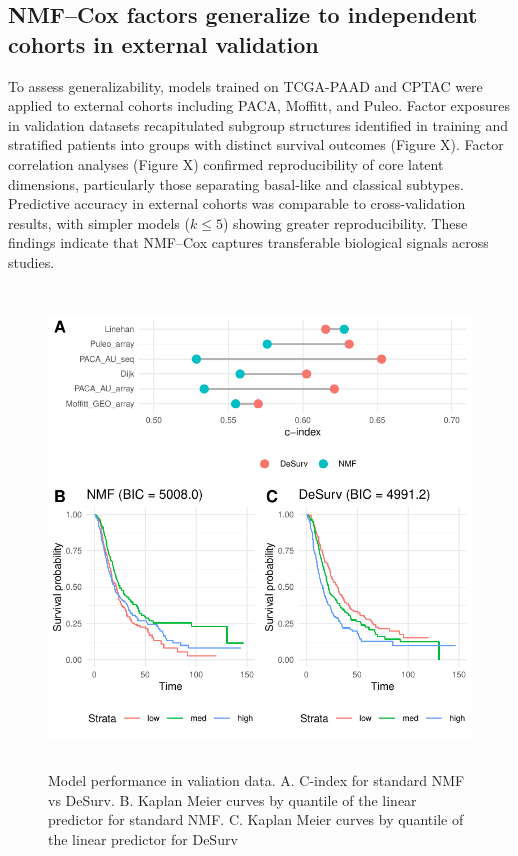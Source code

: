 \documentclass[9pt,twocolumn,twoside,]{pnas-new}
\begin{document}
\subsection{NMF--Cox factors generalize to independent cohorts in
external
validation}\label{nmfcox-factors-generalize-to-independent-cohorts-in-external-validation}

To assess generalizability, models trained on TCGA-PAAD and CPTAC were
applied to external cohorts including PACA, Moffitt, and Puleo. Factor
exposures in validation datasets recapitulated subgroup structures
identified in training and stratified patients into groups with distinct
survival outcomes (Figure X). Factor correlation analyses (Figure X)
confirmed reproducibility of core latent dimensions, particularly those
separating basal-like and classical subtypes. Predictive accuracy in
external cohorts was comparable to cross-validation results, with
simpler models (\(k\leq 5\)) showing greater reproducibility. These
findings indicate that NMF--Cox captures transferable biological signals
across studies.

\begin{figure}[t]

{\centering \includegraphics[width=5in,height=5in]{paper_files/figure-latex/fig-external-1} 

}

\caption{Model performance in valiation data. A. C-index for standard NMF vs DeSurv. B. Kaplan Meier curves by quantile of the linear predictor for standard NMF. C. Kaplan Meier curves by quantile of the linear predictor for DeSurv}\label{fig:fig-external}
\end{figure}
\end{document}
